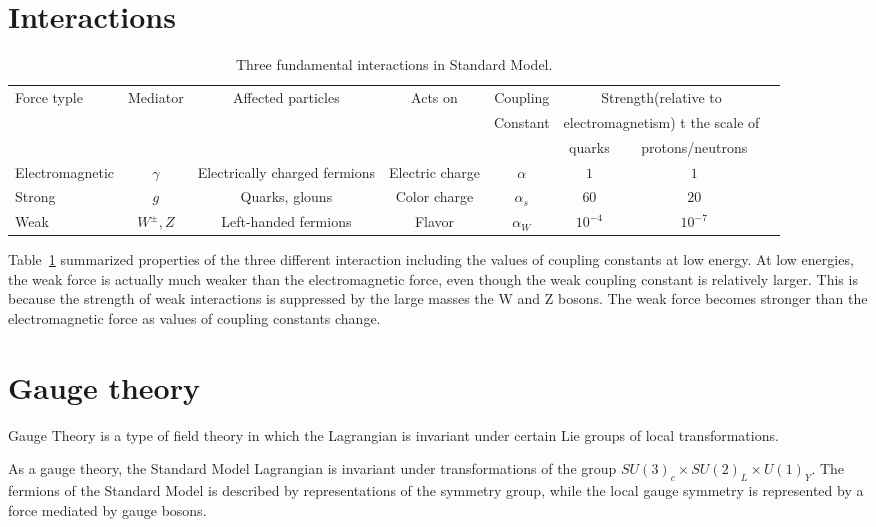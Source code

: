 \section{Interactions}
\begin{table}[tbh]
\centering
\tiny
\begin{tabular}{|l|c|c|c|c|c|c|c}

\hline
    Force typle & Mediator & Affected particles & Acts on & Coupling&  \multicolumn{2}{c|}{Strength(relative to }\\
    &&&&Constant &\multicolumn{2}{c|}{electromagnetism) t the scale of}\\ 
    \hline
   &&&&&quarks& protons/neutrons \\
\hline
\hline
    Electromagnetic & $\gamma$&Electrically charged fermions&Electric charge& $\alpha$ &$1$&$1$\\
    Strong  & $g$ &Quarks, glouns & Color charge& $\alpha_s$ &$60$&$20$\\
    Weak & $W^{\pm}, Z$ &Left-handed fermions & Flavor& $\alpha_W$ &$10^{-4}$&$10^{-7}$\\
\hline

\end{tabular}
\caption{Three fundamental interactions in Standard Model. }
\label{tab:forces}
\end{table}

\par Table~\ref{tab:forces} summarized properties of the three different interaction including the values of coupling constants at low energy. 
At low energies, the weak force is actually much weaker than the electromagnetic force, even though the weak coupling constant is relatively larger. 
This is because the strength of weak interactions is suppressed by the large masses the W and Z bosons. The weak force becomes stronger than the electromagnetic force as values of coupling constants change.

\section{Gauge theory}
\par Gauge Theory is a type of field theory in which the Lagrangian is invariant under certain Lie groups of local transformations.
\par As a gauge theory, the Standard Model Lagrangian is invariant under transformations of the group $SU(3)_c \times SU(2)_L \times U(1)_Y$. The fermions of the Standard Model is described by representations of the symmetry group, while the local gauge symmetry is represented by a force mediated by gauge bosons.

